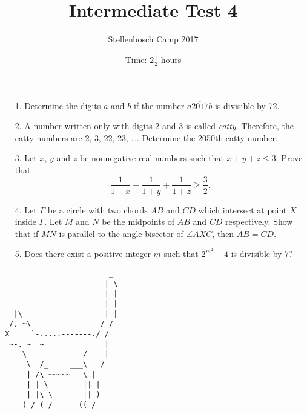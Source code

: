 \documentclass[12pt]{article}
\title{Intermediate Test 4}
\author{Stellenbosch Camp 2017}
\date{Time: $2\frac{1}{2}$ hours}
\begin{document}
 \maketitle

\begin{enumerate}

\item[1.] %
Determine the digits $a$ and $b$ if the number $\overline{a2017b}$ is divisible by 72.


\item[2.] %
A number written only with digits 2 and 3 is called \emph{catty}. Therefore, the catty numbers are 2, 3, 22, 23, \ldots. Determine the 2050th catty number.


\item[3.] %
Let $x$, $y$ and $z$ be nonnegative real numbers such that $x+y+z \leq 3$. Prove that
	\[ \frac{1}{1+x} +\frac{1}{1+y} +\frac{1}{1+z} \geq \frac{3}{2}. \]


\item[4.] %
Let $\Gamma$ be a circle with two chords $AB$ and $CD$ which intersect at point $X$ inside $\Gamma$. Let $M$ and $N$ be the midpoints of $AB$ and $CD$ respectively. Show that if $MN$ is parallel to the angle bisector of $\angle AXC$, then $AB = CD$.
 

\item[5.] %
Does there exist a positive integer $m$ such that $2^{m^2} - 4$ is divisible by $7$?


\end{enumerate}

\vfill

\centering
\begin{BVerbatim}
                         _
                        | \
                        | |
                        | |
   |\                   | |
  /, ~\                / /
 X     `-.....-------./ /
  ~-. ~  ~              |
     \             /    |
      \  /_     ___\   /
      | /\ ~~~~~   \ |
      | | \        || |
      | |\ \       || )
     (_/ (_/      ((_/
\end{BVerbatim}
\end{document}
